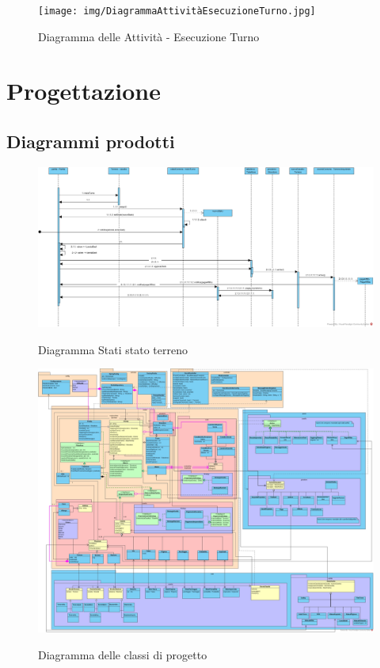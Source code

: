\documentclass{article}
\begin{document}
\begin{figure}[H]
\centering
\texttt{[image: img/DiagrammaAttivitàEsecuzioneTurno.jpg]}
\caption{Diagramma delle Attività - Esecuzione Turno}
\end{figure}



\section{Progettazione}
\subsection{Diagrammi prodotti}
\begin{figure}[H]
\centering
\href{https://github.com/UnimibSoftEngCourse2022/progetto-monopoly-1-gangoffour2/blob/feat/doc/doc/img/DiagrammaDiSequenzaDiProgettazioneTurnoGiocatore.jpg?raw=true}
	{\includegraphics[width=\textwidth]{DiagrammaDiSequenzaDiProgettazioneTurnoGiocatore}}
\caption{Diagramma Stati stato terreno}
\end{figure}

\begin{figure}[H]
\centering
\href{https://github.com/UnimibSoftEngCourse2022/progetto-monopoly-1-gangoffour2/blob/feat/doc/doc/img/DiagrammaDelleClassi.jpg?raw=true}
	{\includegraphics[width=\textwidth]{img/DiagrammaDelleClassi.jpg}}
\caption{Diagramma delle classi di progetto}
\end{figure}
\end{document}
